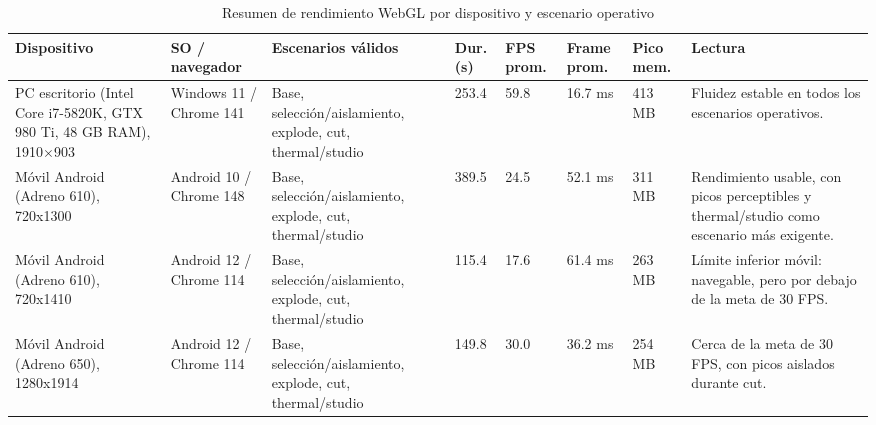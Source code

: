 %

\begin{table}[H]
    \caption{Resumen de rendimiento WebGL por dispositivo y escenario operativo}
    \label{tab:rendimiento_webgl_resumen_dispositivos}
    \centering
    \scriptsize
    \singlespacing
    \renewcommand{\arraystretch}{1.08}
    \setlength{\tabcolsep}{2pt}
    \begin{tabular}{p{2.5cm}p{2.1cm}p{2.65cm}p{0.9cm}p{1.05cm}p{1.25cm}p{1.1cm}p{2.15cm}}
        \hline
        \textbf{Dispositivo} & \textbf{SO / navegador} & \textbf{Escenarios válidos} & \textbf{Dur. (s)} & \textbf{FPS prom.} & \textbf{Frame prom.} & \textbf{Pico mem.} & \textbf{Lectura} \\ \hline
        PC escritorio (Intel Core i7-5820K, GTX 980 Ti, 48 GB RAM), 1910\(\times\)903 & Windows 11 / Chrome 141 & Base, selección/aislamiento, explode, cut, thermal/studio & 253.4 & 59.8 & 16.7 ms & 413 MB & Fluidez estable en todos los escenarios operativos. \\
        Móvil Android (Adreno 610), 720x1300 & Android 10 / Chrome 148 & Base, selección/aislamiento, explode, cut, thermal/studio & 389.5 & 24.5 & 52.1 ms & 311 MB & Rendimiento usable, con picos perceptibles y thermal/studio como escenario más exigente. \\
        Móvil Android (Adreno 610), 720x1410 & Android 12 / Chrome 114 & Base, selección/aislamiento, explode, cut, thermal/studio & 115.4 & 17.6 & 61.4 ms & 263 MB & Límite inferior móvil: navegable, pero por debajo de la meta de 30 FPS. \\
        Móvil Android (Adreno 650), 1280x1914 & Android 12 / Chrome 114 & Base, selección/aislamiento, explode, cut, thermal/studio & 149.8 & 30.0 & 36.2 ms & 254 MB & Cerca de la meta de 30 FPS, con picos aislados durante cut. \\

\end{tabular}
\end{table}
